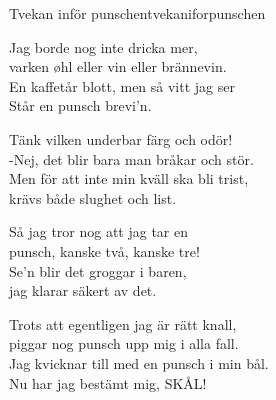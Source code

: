 \begin{song}{Tvekan inför punschen}{tvekaniforpunschen}
\begin{vers}
Jag borde nog inte dricka mer,\\
varken øhl eller vin eller brännevin.\\
En kaffetår blott, men så vitt jag ser \\
Står en punsch brevi'n.\\
\end{vers}
\begin{vers}
Tänk vilken underbar färg och odör!\\
-Nej, det blir bara man bråkar och stör.\\
Men för att inte min kväll ska bli trist,\\
krävs både slughet och list.\\
\end{vers}
\begin{vers}
Så jag tror nog att jag tar en\\
punsch, kanske två, kanske tre!\\
Se'n blir det groggar i baren,\\
jag klarar säkert av det.
\end{vers}
\begin{vers}
Trots att egentligen jag är rätt knall,\\
piggar nog punsch upp mig i alla fall.\\
Jag kvicknar till med en punsch i min bål.\\
Nu har jag bestämt mig, SKÅL!\\
\end{vers}
\end{song}
